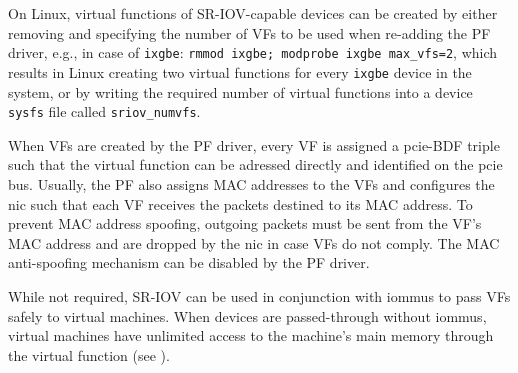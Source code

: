 On Linux, virtual functions of SR-IOV-capable devices can be created by either
removing and specifying the number of VFs to be used when re-adding the PF
driver, e.g., in case of \texttt{ixgbe}: \texttt{rmmod ixgbe; modprobe ixgbe
max\_vfs=2}, which results in Linux creating two virtual functions for every
\texttt{ixgbe} device in the system, or by writing the required number of
virtual functions into a device \texttt{sysfs} file called
\texttt{sriov\_numvfs}.

When VFs are created by the PF driver, every VF is assigned a \ac{pcie}-BDF
triple such that the virtual function can be adressed directly and identified on
the \ac{pcie} bus. Usually, the PF also assigns MAC addresses to the VFs and
configures the \ac{nic} such that each VF receives the packets destined to its
MAC address. To prevent MAC address spoofing, outgoing packets must be sent from
the VF's MAC address and are dropped by the \ac{nic} in case VFs do not comply.
The MAC anti-spoofing mechanism can be disabled by the PF driver.

While not required, SR-IOV can be used in conjunction with \acp{iommu} to pass
VFs safely to virtual machines. When devices are passed-through without
\acp{iommu}, virtual machines have unlimited access to the machine's main memory
through the virtual function (see ).

